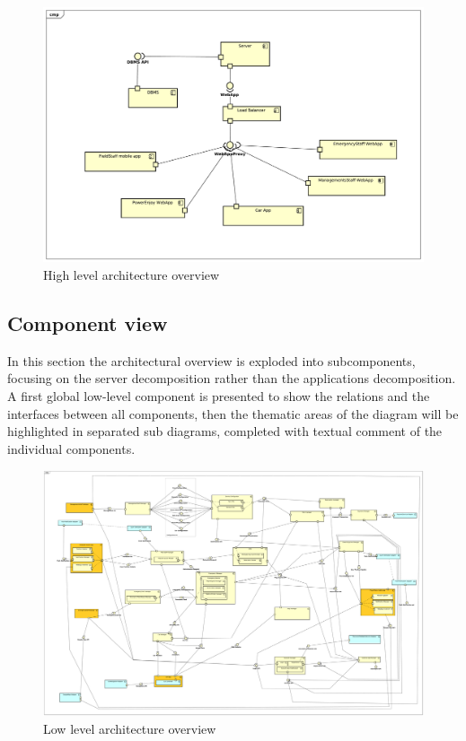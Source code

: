 \documentclass[english]{article}
\begin{document}
			\begin{figure}[H]
				\centering
				\includegraphics[scale=0.25]{./ComponentDiagrams/HighLevel.pdf}%
				\caption{High level architecture overview}
			\end{figure}
	\subsection{Component view}
		In this section the architectural overview is exploded into subcomponents, focusing on the server decomposition rather than the applications decomposition.\\
		A first global low-level component is presented to show the relations and the interfaces between all components, then the thematic areas of the diagram will be highlighted in separated sub diagrams, completed with textual comment of the individual components.
		\begin{landscape}
			\noindent
			\begin{figure}[H]
				\centering
				\includegraphics[scale=0.1068]{./ComponentDiagrams/LowLevel.pdf}%
				\caption{Low level architecture overview}
			\end{figure}
		\end{landscape}	
\end{document}
